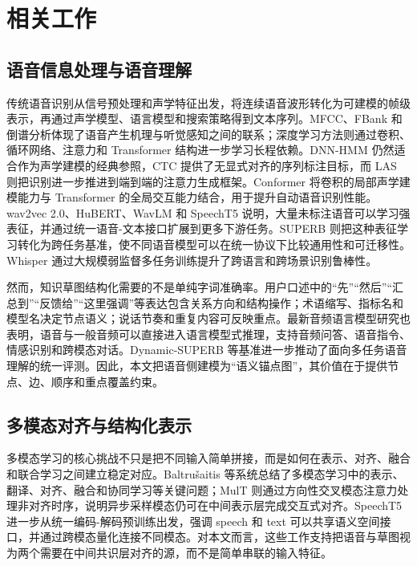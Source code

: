 \documentclass[UTF8,a4paper,12pt,fontset=fandol]{ctexart}
\begin{document}
\section{相关工作}

\subsection{语音信息处理与语音理解}

传统语音识别从信号预处理和声学特征出发，将连续语音波形转化为可建模的帧级表示，再通过声学模型、语言模型和搜索策略得到文本序列。MFCC、FBank 和倒谱分析体现了语音产生机理与听觉感知之间的联系；深度学习方法则通过卷积、循环网络、注意力和 Transformer 结构进一步学习长程依赖。DNN-HMM 仍然适合作为声学建模的经典参照，CTC 提供了无显式对齐的序列标注目标，而 LAS 则把识别进一步推进到端到端的注意力生成框架\cite{hinton2012dnnhmm,graves2006ctc,chan2015las}。Conformer 将卷积的局部声学建模能力与 Transformer 的全局交互能力结合，用于提升自动语音识别性能\cite{gulati2020conformer}。wav2vec 2.0、HuBERT、WavLM 和 SpeechT5 说明，大量未标注语音可以学习强表征，并通过统一语音-文本接口扩展到更多下游任务\cite{baevski2020wav2vec2,hsu2021hubert,chen2022wavlm,ao2022speecht5}。SUPERB 则把这种表征学习转化为跨任务基准，使不同语音模型可以在统一协议下比较通用性和可迁移性\cite{yang2021superb}。Whisper 通过大规模弱监督多任务训练提升了跨语言和跨场景识别鲁棒性\cite{radford2022whisper}。

然而，知识草图结构化需要的不是单纯字词准确率。用户口述中的“先”“然后”“汇总到”“反馈给”“这里强调”等表达包含关系方向和结构操作；术语缩写、指标名和模型名决定节点语义；说话节奏和重复内容可反映重点。最新音频语言模型研究也表明，语音与一般音频可以直接进入语言模型式推理，支持音频问答、语音指令、情感识别和跨模态对话\cite{tang2023salmonn,chu2024qwen2audio,kong2024audioflamingo}。Dynamic-SUPERB 等基准进一步推动了面向多任务语音理解的统一评测\cite{huang2023dynamicsuperb}。因此，本文把语音侧建模为“语义锚点图”，其价值在于提供节点、边、顺序和重点覆盖约束。

\subsection{多模态对齐与结构化表示}

多模态学习的核心挑战不只是把不同输入简单拼接，而是如何在表示、对齐、融合和联合学习之间建立稳定对应。Baltru\v{s}aitis 等系统总结了多模态学习中的表示、翻译、对齐、融合和协同学习等关键问题\cite{baltrusaitis2017multimodal}；MulT 则通过方向性交叉模态注意力处理非对齐时序，说明异步采样模态仍可在中间表示层完成交互式对齐\cite{tsai2019multit}。SpeechT5 进一步从统一编码-解码预训练出发，强调 speech 和 text 可以共享语义空间接口，并通过跨模态量化连接不同模态\cite{ao2022speecht5}。对本文而言，这些工作支持把语音与草图视为两个需要在中间共识层对齐的源，而不是简单串联的输入特征。
\end{document}
